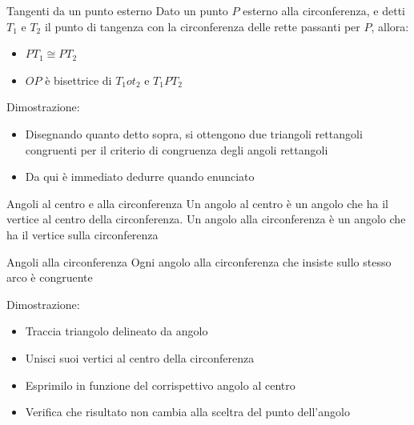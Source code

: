 \begin{teorema}{Tangenti da un punto esterno}
	Dato un punto $ P $ esterno alla circonferenza, e detti $ T_1 $ e $ T_2 $ il punto di tangenza con la circonferenza delle rette passanti per $ P $, allora:
	\begin{itemize}
		\item $ PT_1 \cong PT_2 $
		\item $ OP $ è bisettrice di $ T_1 o t_2 $ e $ T_1 P T_2 $
	\end{itemize}
\end{teorema}
Dimostrazione:
\begin{itemize}
	\item Disegnando quanto detto sopra, si ottengono due triangoli rettangoli congruenti per il criterio di congruenza degli angoli rettangoli
	\item Da qui è immediato dedurre quando enunciato
\end{itemize}

\begin{definizione}{Angoli al centro e alla circonferenza}
	Un angolo al centro è un angolo che ha il vertice al centro della circonferenza. Un angolo alla circonferenza è un angolo che ha il vertice sulla circonferenza
\end{definizione}

\begin{teorema}{Angoli alla circonferenza}
	Ogni angolo alla circonferenza che insiste sullo stesso arco è congruente
\end{teorema}
Dimostrazione:
\begin{itemize}
	\item Traccia triangolo delineato da angolo
	\item Unisci suoi vertici al centro della circonferenza
	\item Esprimilo in funzione del corrispettivo angolo al centro
	\item Verifica che risultato non cambia alla sceltra del punto dell'angolo
\end{itemize}


